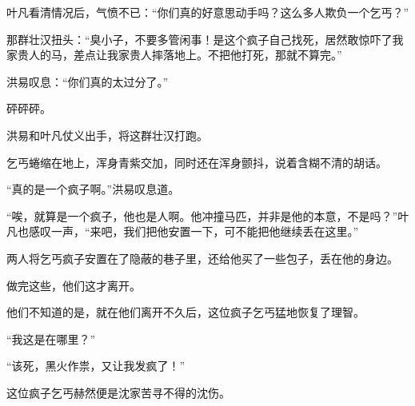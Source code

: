 \begin{this_body}
叶凡看清情况后，气愤不已：“你们真的好意思动手吗？这么多人欺负一个乞丐？”

那群壮汉扭头：“臭小子，不要多管闲事！是这个疯子自己找死，居然敢惊吓了我家贵人的马，差点让我家贵人摔落地上。不把他打死，那就不算完。”

洪易叹息：“你们真的太过分了。”

砰砰砰。

洪易和叶凡仗义出手，将这群壮汉打跑。

乞丐蜷缩在地上，浑身青紫交加，同时还在浑身颤抖，说着含糊不清的胡话。

“真的是一个疯子啊。”洪易叹息道。

“唉，就算是一个疯子，他也是人啊。他冲撞马匹，并非是他的本意，不是吗？”叶凡也感叹一声，“来吧，我们把他安置一下，可不能把他继续丢在这里。”

两人将乞丐疯子安置在了隐蔽的巷子里，还给他买了一些包子，丢在他的身边。

做完这些，他们这才离开。

他们不知道的是，就在他们离开不久后，这位疯子乞丐猛地恢复了理智。

“我这是在哪里？”

“该死，黑火作祟，又让我发疯了！”

这位疯子乞丐赫然便是沈家苦寻不得的沈伤。

\end{this_body}


